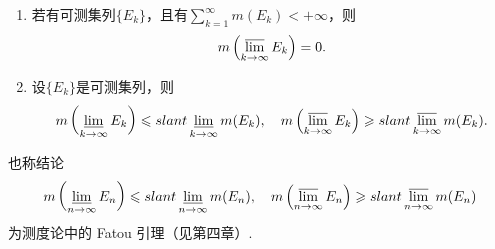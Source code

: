 \documentclass[../../main.tex]{subfiles}
\begin{document}
\begin{theorem}\label{theorem:可测集的Fatou引理}
\begin{enumerate}[(1)]
\item 若有可测集列$\{E_k\}$，且有$\sum_{k = 1}^{\infty}m(E_k)<+\infty$，则
\begin{align*}
m\left(\varlimsup_{k\to\infty}E_k\right)= 0.
\end{align*}

\item 设$\{E_k\}$是可测集列，则
\begin{align*}
m\left(\varliminf_{k\to\infty}E_k\right)\leqslant slant\varliminf_{k\to\infty}m(E_k),\quad m\left(\varlimsup_{k\to\infty}E_k\right)\geqslant slant\varlimsup_{k\to\infty}m(E_k).
\end{align*}
\end{enumerate}
\end{theorem}
\begin{remark}
也称结论
\begin{align*}
m\left(\varliminf_{n\to\infty}E_n\right)\leqslant slant\varliminf_{n\to\infty}m(E_n),\quad m\left(\varlimsup_{n\to\infty}E_n\right)\geqslant slant\varlimsup_{n\to\infty}m(E_n)
\end{align*}
为测度论中的 Fatou 引理（见第四章）.
\end{remark}
\end{document}
